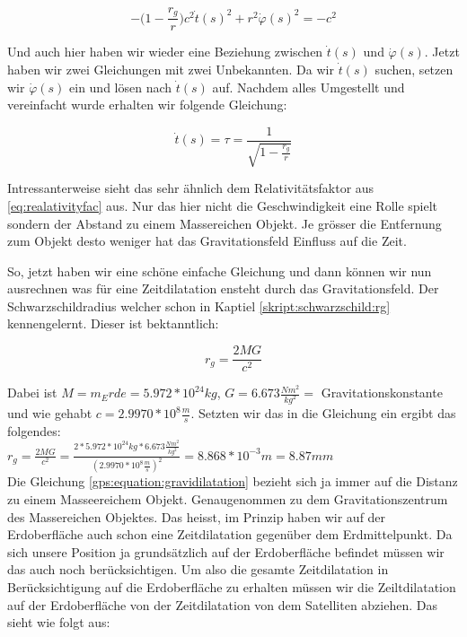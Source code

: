\begin{refsection}
\begin{equation}
-\biggl(1-\frac{r_g}r\biggr)c^2 \dot t(s)^2 + r^2  \dot \varphi (s)^2 = -c^2 
\end{equation}

\noindent{}Und auch hier haben wir wieder eine Beziehung zwischen \( \dot t(s) \) und \( \dot \varphi(s) \). Jetzt haben wir zwei Gleichungen mit zwei Unbekannten. Da wir \( \dot t(s) \) suchen, setzen wir \( \dot \varphi(s) \) ein und lösen nach \( \dot t(s) \) auf. Nachdem alles Umgestellt und vereinfacht wurde erhalten wir folgende Gleichung:

\begin{equation}
\label{gps:equation:gravidilatation}
\dot t(s) = \tau = \frac{1}{\sqrt{1-\frac{r_g}{r}}}
\end{equation}

\noindent{}Intressanterweise sieht das sehr ähnlich dem Relativitätsfaktor aus \ref{eq:realativityfac} aus. Nur das hier nicht die Geschwindigkeit eine Rolle spielt sondern der Abstand zu einem Massereichen Objekt. Je grösser die Entfernung zum Objekt desto weniger hat das Gravitationsfeld Einfluss auf die Zeit. 

So, jetzt haben wir eine schöne einfache Gleichung und dann können wir nun ausrechnen was für eine Zeitdilatation ensteht durch das Gravitationsfeld. Der Schwarzschildradius welcher schon in Kaptiel \ref{skript:schwarzschild:rg} kennengelernt. Dieser ist bektanntlich:

\begin{equation}
 r_g=\frac{2MG}{c^2}
\end{equation}

\noindent{}Dabei ist \( M = m_Erde = 5.972 * 10^{24}kg \), \( G = 6.673 \frac{Nm^2}{kg^2} = \) Gravitationskonstante und wie gehabt \( c = 2.9970 * 10^8 \frac{m}{s} \). Setzten wir das in die Gleichung ein ergibt das folgendes:\\

\( r_g=\frac{2MG}{c^2} = \frac{2 * 5.972 * 10^{24}kg *  6.673 \frac{Nm^2}{kg^2}}{ (2.9970 * 10^8 \frac{m}{s})^2} = 8.868 * 10^{-3}m = 8.87mm\) \\

Die Gleichung \ref{gps:equation:gravidilatation} bezieht sich ja immer auf die Distanz zu einem Masseereichem Objekt. Genaugenommen zu dem Gravitationszentrum des Massereichen Objektes. Das heisst, im Prinzip haben wir auf der Erdoberfläche auch schon eine Zeitdilatation gegenüber dem Erdmittelpunkt. Da sich unsere Position ja grundsätzlich auf der Erdoberfläche befindet müssen wir das auch noch berücksichtigen. Um also die gesamte Zeitdilatation in Berücksichtigung auf die Erdoberfläche zu erhalten müssen wir die Zeiltdilatation auf der Erdoberfläche von der Zeitdilatation von dem Satelliten abziehen. Das sieht wie folgt aus: \\


\end{refsection}

